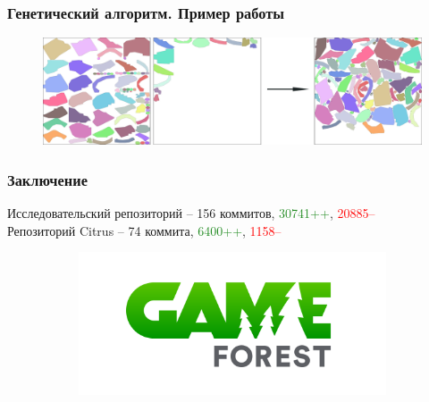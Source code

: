 \documentclass[10pt, unicode]{beamer}
\begin{document}
    \begin{frame}
        \frametitle{Генетический алгоритм. Пример работы}
        \begin{figure}[H]
            \centering
            \includegraphics[width=\linewidth, keepaspectratio]{1.png}
        \end{figure}
    \end{frame}
    \begin{frame}
        \frametitle{Заключение}
        Исследовательский репозиторий -- 156 коммитов, \textcolor{ForestGreen}{30741++}, \textcolor{red}{20885--}\\
        Репозиторий Citrus -- 74 коммита, \textcolor{ForestGreen}{6400++}, \textcolor{red}{1158--}
        \begin{figure}[H]
            \centering
            \begin{subfigure}{0.49\linewidth}
                \centering
                \includegraphics[scale=0.2]{GF.png}
            \end{subfigure}
            \begin{subfigure}{0.49\linewidth}
                \centering

\end{subfigure}
\end{figure}
\end{frame}
\end{document}

